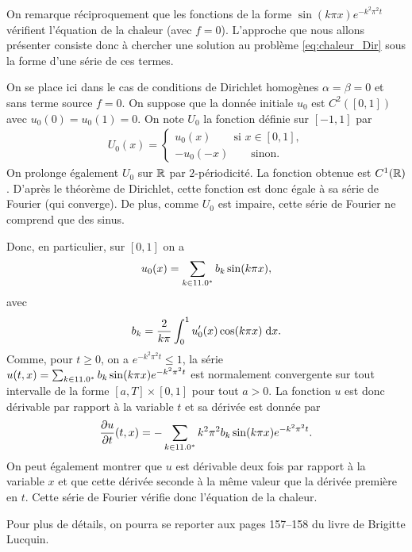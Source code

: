 \documentclass[12pt,a4paper,twoside]{article}
\begin{document}
On remarque r\'eciproquement
que les fonctions de la forme $\sin(k \pi x) e^{-k^2 \pi^2 t}$
v\'erifient l'\'equation de la chaleur (avec $f = 0$).
L'approche que nous allons pr\'esenter consiste donc \`a 
chercher une solution au probl\`eme \eqref{eq:chaleur_Dir} sous la forme
d'une s\'erie de ces termes.

On se place ici dans le cas de conditions de Dirichlet homog\`enes
$\alpha = \beta = 0$ et sans terme source $f=0$.
On suppose que la donn\'ee initiale $u_0$ est $C^2([0,1])$ avec $u_0(0) = u_0(1) = 0$.
On note $U_0$ la fonction d\'efinie sur $[-1,1]$ par
\begin{align*}
  U_0(x) =
  \begin{cases}
    u_0(x) \qquad \text{si } x \in [0,1] ,
    \\
    -u_0(-x) \qquad \text{sinon} .
  \end{cases}
\end{align*}
On prolonge \'egalement $U_0$ sur $\mathbb{R}$ par $2$-p\'eriodicit\'e.
La fonction obtenue est $C^1(\mathbb{R})$.
D'apr\`es le th\'eor\`eme de Dirichlet, cette fonction est donc \'egale \`a 
sa s\'erie de Fourier (qui converge).
De plus, comme $U_0$ est impaire, cette s\'erie de Fourier ne comprend que 
des sinus.

Donc, en particulier, sur $[0,1]$ on a 
\begin{align*}
  u_0(x) = \sum_{k \in 11.0^*} b_k \sin(k \pi x) ,
\end{align*}
avec
\begin{align*}
  b_k = \dfrac{2}{k \pi} \int_{0}^1 u_0'(x) \cos(k \pi x) \;\mathrm{d} x .
\end{align*}
Comme, pour $t \geq 0$, on a $e^{-k^2 \pi^2 t} \leq 1$, la s\'erie 
$u(t,x) = \sum_{k\in11.0^*} b_k \sin(k \pi x) e^{- k^2 \pi^2 t}$ est normalement
convergente sur tout intervalle de la forme
$[a,T] \times [0,1]$ pour tout $a > 0$.
La fonction $u$ est donc d\'erivable par rapport \`a la variable $t$
et sa d\'eriv\'ee est donn\'ee par
\begin{align*}
  \dfrac{\partial u}{\partial t} (t,x) 
  = - \sum_{k \in 11.0^*} k^2 \pi^2 b_k \sin(k \pi x) e^{-k^2 \pi^2 t} .
\end{align*}
On peut \'egalement montrer que $u$ est d\'erivable deux fois par rapport
\`a la variable $x$ et que cette d\'eriv\'ee seconde \`a la m\^eme
valeur que la d\'eriv\'ee premi\`ere en $t$.
Cette s\'erie de Fourier v\'erifie donc l'\'equation de la chaleur.

Pour plus de d\'etails, on pourra se reporter aux pages 157--158
du livre de Brigitte Lucquin.
\end{document}
